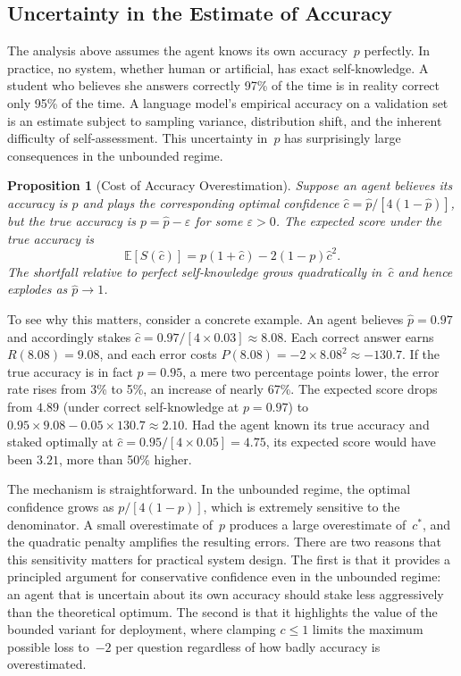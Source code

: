 \documentclass[11pt,a4paper]{article}
\newtheorem{proposition}{Proposition}
\newcommand{\E}{\mathbb{E}}
\newcommand{\cstar}{c^{*}}
\begin{document}
\subsection{Uncertainty in the Estimate of Accuracy}
\label{sec:uncertainty-in-p}

The analysis above assumes the agent knows its own accuracy~$p$
perfectly.  In practice, no system, whether human or artificial, has
exact self-knowledge.  A student who believes she answers correctly
97\% of the time is in reality correct only 95\% of the time.
A language model's empirical accuracy on a validation set is an
estimate subject to sampling variance, distribution shift, and the
inherent difficulty of self-assessment.  This uncertainty in~$p$
has surprisingly large consequences in the unbounded regime.

\begin{proposition}[Cost of Accuracy Overestimation]
\label{prop:p-uncertainty}
  Suppose an agent believes its accuracy is $\hat{p}$ and plays the
  corresponding optimal confidence
  $\hat{c} = \hat{p}/[4(1{-}\hat{p})]$, but the true accuracy is
  $p = \hat{p} - \varepsilon$ for some $\varepsilon > 0$.  The
  expected score under the true accuracy is
  \begin{equation}
    \E[S(\hat{c})] = p(1 + \hat{c}) - 2(1{-}p)\hat{c}^{2}.
    \label{eq:misestimated-score}
  \end{equation}
  The shortfall relative to perfect self-knowledge grows
  quadratically in~$\hat{c}$ and hence explodes as
  $\hat{p} \to 1$.
\end{proposition}

To see why this matters, consider a concrete example.  An agent
believes $\hat{p} = 0.97$ and accordingly stakes
$\hat{c} = 0.97/[4 \times 0.03] \approx 8.08$.  Each correct answer
earns $R(8.08) = 9.08$, and each error costs
$P(8.08) = -2 \times 8.08^{2} \approx -130.7$.  If the true accuracy
is in fact $p = 0.95$, a mere two percentage points lower, the
error rate rises from 3\% to 5\%, an increase of nearly 67\%.  The
expected score drops from $4.89$ (under correct self-knowledge at
$p = 0.97$) to
$0.95 \times 9.08 - 0.05 \times 130.7 \approx 2.10$.  Had the agent
known its true accuracy and staked optimally at
$\hat{c} = 0.95/[4 \times 0.05] = 4.75$, its expected score would have
been $3.21$, more than 50\% higher.

The mechanism is straightforward.  In the unbounded regime, the
optimal confidence grows as $p/[4(1{-}p)]$, which is extremely
sensitive to the denominator.  A small overestimate of~$p$ produces
a large overestimate of~$\cstar$, and the quadratic penalty amplifies
the resulting errors.  There are two reasons that this sensitivity
matters for practical system design.  The first is that it provides
a principled argument for conservative confidence even in the
unbounded regime: an agent that is uncertain about its own accuracy
should stake less aggressively than the theoretical optimum.  The
second is that it highlights the value of the bounded variant for
deployment, where clamping $c \leq 1$ limits the maximum possible
loss to~$-2$ per question regardless of how badly accuracy is
overestimated.
\end{document}
